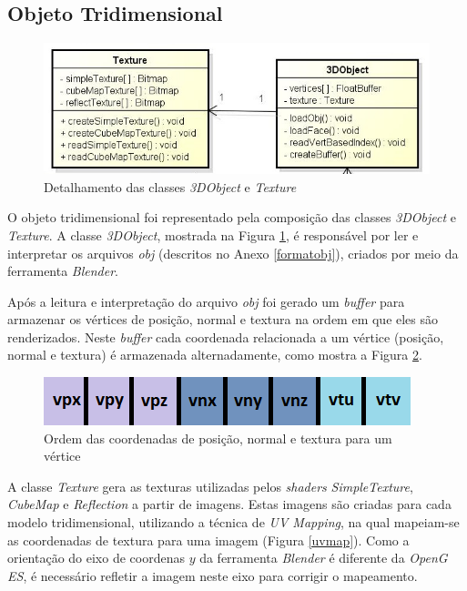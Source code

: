 \subsection{Objeto Tridimensional}   

	\begin{figure}[ht]
	\centering
		\includegraphics[keepaspectratio=true,scale=0.6]{figuras/object_texture.jpg}
	\caption{Detalhamento das classes \textit{3DObject} e \textit{Texture}}
	\label{object_texture}
	\end{figure}

	O objeto tridimensional foi representado pela composição das classes \textit{3DObject} e \textit{Texture}. A classe \textit{3DObject}, mostrada na Figura \ref{object_texture}, é responsável por ler e interpretar os arquivos \textit{obj}  (descritos no Anexo \ref{formatobj}), criados por meio da ferramenta \textit{Blender}.

	Após a leitura e interpretação do arquivo \textit{obj} foi gerado um \textit{buffer} para armazenar os vértices de posição, normal e textura na ordem em que eles são renderizados. Neste \textit{buffer} cada coordenada relacionada a um vértice (posição, normal e textura) é armazenada alternadamente, como mostra a Figura \ref{buffer}.

	\begin{figure}[ht]
	\centering
		\includegraphics[keepaspectratio=true,scale=1.0]{figuras/buffer.png}
	\caption{Ordem das coordenadas de posição, normal e textura para um vértice}
	\label{buffer}
	\end{figure}

	A classe \textit{Texture} gera as texturas utilizadas pelos \textit{shaders} \textit{SimpleTexture}, \textit{CubeMap} e \textit{Reflection} a partir de imagens. Estas imagens são criadas para cada modelo tridimensional, utilizando a técnica de \textit{UV Mapping}, na qual mapeiam-se as coordenadas de textura para uma imagem (Figura \ref{uvmap}). Como a orientação do eixo de coordenas $y$ da ferramenta \textit{Blender} é diferente da \textit{OpenG ES}, é necessário refletir a imagem neste eixo para corrigir o mapeamento.


